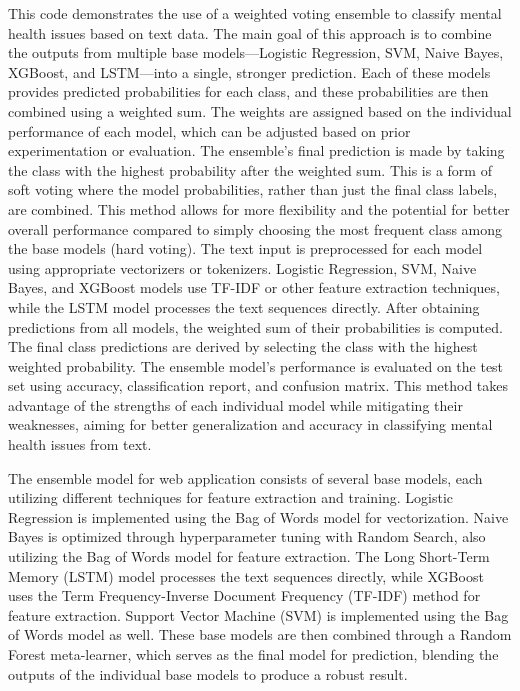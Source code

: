 \noindent
This code demonstrates the use of a weighted voting ensemble to classify mental health issues based on text data. The main goal of this approach is to combine the outputs from multiple base models—Logistic Regression, SVM, Naive Bayes, XGBoost, and LSTM—into a single, stronger prediction. Each of these models provides predicted probabilities for each class, and these probabilities are then combined using a weighted sum. The weights are assigned based on the individual performance of each model, which can be adjusted based on prior experimentation or evaluation. The ensemble's final prediction is made by taking the class with the highest probability after the weighted sum. This is a form of soft voting where the model probabilities, rather than just the final class labels, are combined. This method allows for more flexibility and the potential for better overall performance compared to simply choosing the most frequent class among the base models (hard voting). The text input is preprocessed for each model using appropriate vectorizers or tokenizers. Logistic Regression, SVM, Naive Bayes, and XGBoost models use TF-IDF or other feature extraction techniques, while the LSTM model processes the text sequences directly. After obtaining predictions from all models, the weighted sum of their probabilities is computed. The final class predictions are derived by selecting the class with the highest weighted probability. The ensemble model’s performance is evaluated on the test set using accuracy, classification report, and confusion matrix. This method takes advantage of the strengths of each individual model while mitigating their weaknesses, aiming for better generalization and accuracy in classifying mental health issues from text.

\vspace{1em}

\noindent
The ensemble model for web application consists of several base models, each utilizing different techniques for feature extraction and training. Logistic Regression is implemented using the Bag of Words model for vectorization. Naive Bayes is optimized through hyperparameter tuning with Random Search, also utilizing the Bag of Words model for feature extraction. The Long Short-Term Memory (LSTM) model processes the text sequences directly, while XGBoost uses the Term Frequency-Inverse Document Frequency (TF-IDF) method for feature extraction. Support Vector Machine (SVM) is implemented using the Bag of Words model as well. These base models are then combined through a Random Forest meta-learner, which serves as the final model for prediction, blending the outputs of the individual base models to produce a robust result.


\pagebreak

